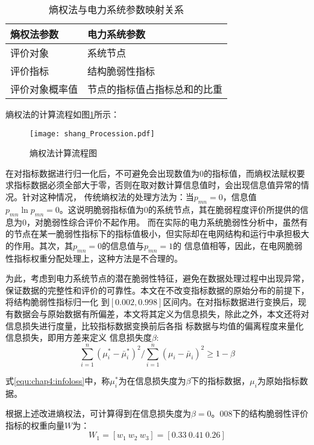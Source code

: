 \begin{table}[htb]
  \centering
  \caption{熵权法与电力系统参数映射关系}
  \label{tab:lichaTable1}
    \begin{tabular}{C{5.5cm}C{5.5cm}}
      \toprule
      熵权法参数 & 电力系统参数 \\
      \midrule
      评价对象 &  系统节点 \\
      评价指标 &  结构脆弱性指标 \\
      评价对象概率值 & 节点的指标值占指标总和的比重 \\
      \bottomrule
    \end{tabular}
\end{table}

熵权法的计算流程如图\ref{fig:shang_Procession}所示：
\begin{figure}[H] %
  \centering
  \texttt{[image: shang\_Procession.pdf]}
  \caption{熵权法计算流程图}
  \label{fig:shang_Procession}
\end{figure}

在对指标数据进行归一化后，不可避免会出现数值为0的指标值，而熵权法赋权要求指标数据必须全部大于零，否则在取对数计算信息值时，会出现信息值异常的情况。针对这种情况，
传统熵权法的处理方法为：当$p_{mn}=0$，信息值$p_{m n} \ln p_{m n}=0$。这说明脆弱指标值为0的系统节点，其在脆弱程度评价所提供的信息为0，对脆弱性综合评价不起作用。
而在实际的电力系统脆弱性分析中，虽然有的节点在某一脆弱性指标下的指标值极小，但实际却在电网结构和运行中承担极大的作用。其次，其$p_{mn}=0$的信息值与$p_{mn}=1$的
信息值相等，因此，在电网脆弱性指标权重分配处理上，这种方法是不合理的。

为此，考虑到电力系统节点的潜在脆弱性特征，避免在数据处理过程中出现异常，保证数据的完整性和评价的可靠性。本文在不改变指标数据的原始分布的前提下，将结构脆弱性指标归一化
到$[0.002,0.998]$区间内。在对指标数据进行变换后，现有数据会与原始数据有所偏差，本文将其定义为信息损失，除此之外，本文还将对信息损失进行度量，比较指标数据变换前后各指
标数据与均值的偏离程度来量化信息损失，即用方差来定义
信息损失度$\beta$:
\begin{equation}
  \label{equ:chap4:infoloss}
\sum_{i=1}^{n}\left(\mu_{i}^{*}-\bar{\mu}_{i}^{*}\right)^{2} /\sum_{i=1}^{n}\left(\mu_{i}-\bar{\mu}_{i}\right)^{2} \geq 1-\beta 
\end{equation}

式\ref{equ:chap4:infoloss}中，称$\mu_{i}^{*}$为在信息损失度为$\beta$下的指标数据，$\mu_{i}$为原始指标数据。

根据上述改进熵权法，可计算得到在信息损失度为$\beta=0。008$下的结构脆弱性评价指标的权重向量$W$为：
\begin{equation}
\label{equ:chap4:shang2}
   W_1 = \left[w_{1}\ w_{2}\ w_{3}\right]=[0.33\ 0.41\ 0.26]
\end{equation}



